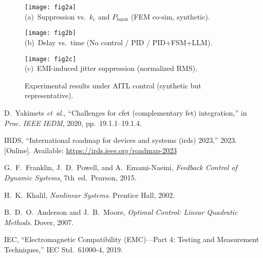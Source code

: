 \documentclass[conference]{IEEEtran}
\begin{document}
\begin{figure*}[t]
\centering
\begin{minipage}{0.32\textwidth}
  \centering
  \texttt{[image: fig2a]}\\[6pt]
  \footnotesize (a)~Suppression vs.\ $k_c$ and $P_{\mathrm{burst}}$ (FEM co-sim, synthetic).
\end{minipage}
\hfill
\begin{minipage}{0.32\textwidth}
  \centering
  \texttt{[image: fig2b]}\\[6pt]
  \footnotesize (b)~Delay vs.\ time (No control / PID / PID+FSM+LLM).
\end{minipage}
\hfill
\begin{minipage}{0.32\textwidth}
  \centering
  \texttt{[image: fig2c]}\\[6pt]
  \footnotesize (c)~EMI-induced jitter suppression (normalized RMS).
\end{minipage}

\vspace{6pt}
\caption{Experimental results under AITL control (synthetic but representative).}
\label{fig:exp}
\end{figure*}


\begin{thebibliography}{6}

D.~Yakimets \emph{et~al.}, ``Challenges for cfet (complementary fet) integration,''
in \emph{Proc. IEEE IEDM}, 2020, pp.~19.1.1--19.1.4.

IRDS, ``International roadmap for devices and systems (irds) 2023,'' 2023.
[Online]. Available: \url{https://irds.ieee.org/roadmap-2023}

G.~F.~Franklin, J.~D.~Powell, and A.~Emami-Naeini, \emph{Feedback Control of
Dynamic Systems}, 7th~ed.\ Pearson, 2015.

H.~K.~Khalil, \emph{Nonlinear Systems}. Prentice Hall, 2002.

B.~D.~O.~Anderson and J.~B.~Moore, \emph{Optimal Control: Linear Quadratic Methods}.
Dover, 2007.

IEC, ``Electromagnetic Compatibility (EMC)---Part 4: Testing and Measurement Techniques,''
IEC Std.\ 61000-4, 2019.

\end{thebibliography}
\end{document}
